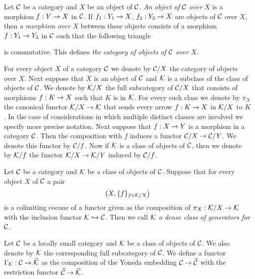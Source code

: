 \begin{definition}
Let ${\mathcal C}$ be a category and $X$ be an object of ${\mathcal C}$. \textit{An object of ${\mathcal C}$ over $X$} is a morphism $f:Y\rightarrow X$ in ${\mathcal C}$. If $f_1:Y_1\rightarrow X$, $f_2:Y_2\rightarrow X$ are objects of ${\mathcal C}$ over $X$, then \textit{a morphism over $X$} between these objects consists of a morphism $f:Y_1\rightarrow Y_2$ in ${\mathcal C}$ such that the following triangle
\begin{center}
\end{center}
is commutative. This defines \textit{the category of objects of ${\mathcal C}$ over $X$}.
\end{definition}
\noindent
For every object $X$ of a category ${\mathcal C}$ we denote by ${\mathcal C}/X$ the category of objects over $X$. Next suppose that $X$ is an object of ${\mathcal C}$ and ${\mathcal K}$ is a subclass of the class of  objects of ${\mathcal C}$. We denote by ${\mathcal K}/X$ the full subcategory of ${\mathcal C}/X$ that consists of morphisms $f:K\rightarrow X$ such that $K$ is in ${\mathcal K}$. For every such class we denote by $\pi_X$ the canonical functor ${\mathcal K}/X\rightarrow {\mathcal K}$ that sends every arrow $f:K\rightarrow X$ in ${\mathcal K}/X$ to $K$. In the case of considerations in which multiple distinct classes are involved we specify more precise notation. Next suppose that $f:X\rightarrow Y$ is a morphism in a category ${\mathcal C}$. Then the composition with $f$ induces a functor ${\mathcal C}/X\rightarrow {\mathcal C}/Y$. We denote this functor by ${\mathcal C}/f$. Now if ${\mathcal K}$ is a class of objects of ${\mathcal C}$, then we denote by ${\mathcal K}/f$ the functor ${\mathcal K}/X\rightarrow {\mathcal K}/Y$ induced by ${\mathcal C}/f$.

\begin{definition}
Let ${\mathcal C}$ be a category and ${\mathcal K}$ be a class of objects of ${\mathcal C}$. Suppose that for every object $X$ of ${\mathcal C}$ a pair
$$\left(X,\{f\}_{f\in {\mathcal K}/X}\right)$$
is a colimiting cocone of a functor given as the composition of $\pi_X:{\mathcal K}/X\rightarrow {\mathcal K}$ with the inclusion functor ${\mathcal K} \hookrightarrow {\mathcal C}$. Then we call \textit{${\mathcal K}$ a dense class of generators for ${\mathcal C}$}.
\end{definition}
\noindent
Let ${\mathcal C}$ be a locally small category and ${\mathcal K}$ be a class of objects of ${\mathcal C}$. We also denote by ${\mathcal K}$ the corresponding full subcategory of ${\mathcal C}$. We define a functor $\Gamma_{{\mathcal K}}:{\mathcal C}\rightarrow \widehat{{\mathcal K}}$ as the composition of the Yoneda embedding ${\mathcal C}\rightarrow \widehat{{\mathcal C}}$ with the restriction functor $\widehat{{\mathcal C}}\rightarrow \widehat{{\mathcal K}}$.

